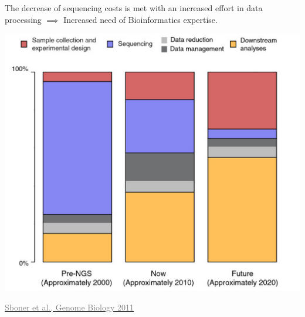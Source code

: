 \documentclass[x11names, svgnames]{beamer}
\begin{document}
\begin{frame}
  \frametitle{\three}
  The decrease of sequencing costs is met with an increased effort in data processing $\implies$ Increased need of Bioinformatics expertise.
  \begin{center}
    \includegraphics[scale=0.11]{images/sequencing_cost}
  \end{center}
  \begin{center}
    \vspace{-0.5em}
    \footnotesize{\href{https://doi.org/10.1186/gb-2011-12-8-125}{\textcolor{gray}{Sboner et al., Genome Biology 2011}}}
  \end{center}
\end{frame}
\end{document}
